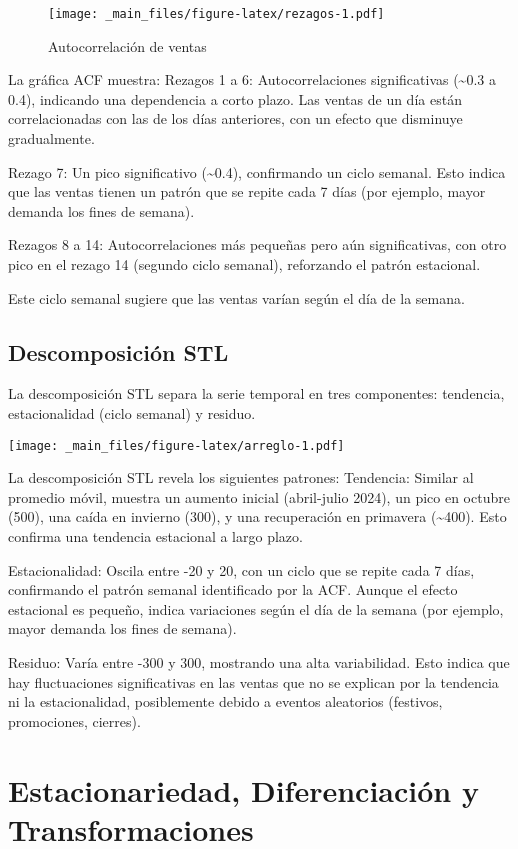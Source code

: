 \documentclass[
]{book}
\begin{document}
\begin{figure}
\centering
\texttt{[image: \_main\_files/figure-latex/rezagos-1.pdf]}
\caption{Autocorrelación de ventas}
\end{figure}

La gráfica ACF muestra: Rezagos 1 a 6: Autocorrelaciones significativas
(\textasciitilde0.3 a 0.4), indicando una dependencia a corto plazo. Las
ventas de un día están correlacionadas con las de los días anteriores,
con un efecto que disminuye gradualmente.

Rezago 7: Un pico significativo (\textasciitilde0.4), confirmando un
ciclo semanal. Esto indica que las ventas tienen un patrón que se repite
cada 7 días (por ejemplo, mayor demanda los fines de semana).

Rezagos 8 a 14: Autocorrelaciones más pequeñas pero aún significativas,
con otro pico en el rezago 14 (segundo ciclo semanal), reforzando el
patrón estacional.

Este ciclo semanal sugiere que las ventas varían según el día de la
semana.

\subsection{Descomposición STL}\label{descomposiciuxf3n-stl}

La descomposición STL separa la serie temporal en tres componentes:
tendencia, estacionalidad (ciclo semanal) y residuo.

\texttt{[image: \_main\_files/figure-latex/arreglo-1.pdf]}

La descomposición STL revela los siguientes patrones: Tendencia: Similar
al promedio móvil, muestra un aumento inicial (abril-julio 2024), un
pico en octubre (500), una caída en invierno (300), y una recuperación
en primavera (\textasciitilde400). Esto confirma una tendencia
estacional a largo plazo.

Estacionalidad: Oscila entre -20 y 20, con un ciclo que se repite cada 7
días, confirmando el patrón semanal identificado por la ACF. Aunque el
efecto estacional es pequeño, indica variaciones según el día de la
semana (por ejemplo, mayor demanda los fines de semana).

Residuo: Varía entre -300 y 300, mostrando una alta variabilidad. Esto
indica que hay fluctuaciones significativas en las ventas que no se
explican por la tendencia ni la estacionalidad, posiblemente debido a
eventos aleatorios (festivos, promociones, cierres).

\section{Estacionariedad, Diferenciación y
Transformaciones}\label{estacionariedad-diferenciaciuxf3n-y-transformaciones}
\end{document}
